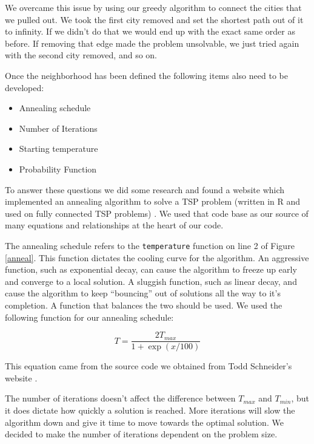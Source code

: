 \documentclass{article}
\def\code#1{\texttt{#1}}
\begin{document}
\begin{multicols}{2}
        We overcame this issue by using our greedy algorithm to connect the cities that we pulled out. We took the first city removed and set the shortest path out of it to infinity. If we didn't do that we would end up with the exact same order as before. If removing that edge made the problem unsolvable, we just tried again with the second city removed, and so on.
        
        Once the neighborhood has been defined the following items also need to be developed:

        \begin{itemize}
            \item {Annealing schedule}
            \item {Number of Iterations}
            \item {Starting temperature}
            \item {Probability Function}
        \end{itemize}

        To answer these questions we did some research and found a website which implemented an annealing algorithm to solve a TSP problem (written in R and used on fully connected TSP problems) \cite{tspWeb}. We used that code base as our source of many equations and relationships at the heart of our code. 

        The annealing schedule refers to the \code{temperature} function on line 2 of Figure \ref{anneal}. This function dictates the cooling curve for the algorithm. An aggressive function, such as exponential decay, can cause the algorithm to freeze up early and converge to a local solution. A sluggish function, such as linear decay, and cause the algorithm to keep ``bouncing'' out of solutions all the way to it's completion. A function that balances the two should be used. We used the following function for our annealing schedule:

        \begin{equation}
            T = \frac{2T_{max}}{1 + \exp{(x/100)}}
        \end{equation}

        This equation came from the source code we obtained from Todd Schneider's website \cite{tspWeb}.

        The number of iterations doesn't affect the difference between $T_{max}$ and $T_{min}$, but it does dictate how quickly a solution is reached. More iterations will slow the algorithm down and give it time to move towards the optimal solution. We decided to make the number of iterations dependent on the problem size.


\end{multicols}
\end{document}
